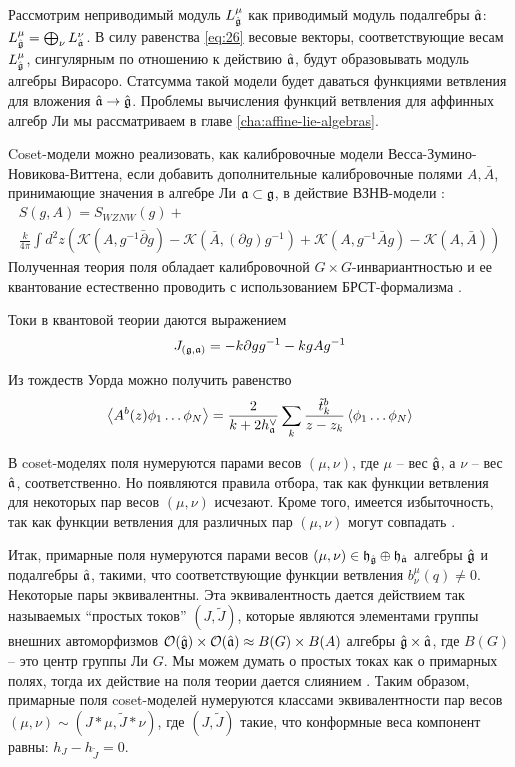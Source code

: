 Рассмотрим неприводимый модуль $L^{\mu}_{\hat{\mathfrak{g}}}$ как приводимый модуль подалгебры $\hat{\mathfrak{a}}$: $L^{\mu}_{\hat{\mathfrak{g}}}=\bigoplus_{\nu}L^{\nu}_{\hat{\mathfrak{a}}}$.  В силу  равенства \eqref{eq:26} весовые векторы, соответствующие весам $L^{\mu}_{\hat{\mathfrak{g}}}$, сингулярным по отношению к действию $\hat{\mathfrak{a}}$, будут образовывать модуль алгебры Вирасоро. Статсумма такой модели будет даваться функциями ветвления для вложения $\hat{\mathfrak{a}}\to\hat{\mathfrak{g}}$. Проблемы вычисления функций ветвления для аффинных алгебр Ли мы рассматриваем в главе \ref{cha:affine-lie-algebras}. 

Coset-модели можно реализовать, как калибровочные модели Весса-Зумино-Новикова-Виттена, если добавить дополнительные калибровочные полями  $A, \bar{A}$, принимающие значения в алгебре Ли $\mathfrak{a}\subset \mathfrak{g}$, в действие ВЗНВ-модели  \cite{gawdzki1988g}:
\begin{multline}
  \label{eq:38}
      S(g,A)=S_{WZNW}(g)+\\
      \frac{k}{4\pi}\int d^{2}z \left(\mathcal{K}(A, g^{-1}\bar \partial g)-\mathcal{K}(\bar A, (\partial g ) g^{-1})+\mathcal{K}(A,g^{-1}\bar A g)-\mathcal{K}(A,\bar A)\right)
\end{multline}
Полученная теория поля обладает калибровочной $G\times G$-инвариантностью  и ее квантование естественно проводить с использованием БРСТ-формализма \cite{hwang1993brst}. 

Токи в квантовой теории даются выражением
\begin{equation}
  \label{eq:39}
  J_{(\mathfrak{g},\mathfrak{a})}=-k\partial g g^{-1} -k g A g^{-1}
\end{equation}

Из тождеств Уорда можно получить равенство
\begin{equation*}
  \left< A^{b}(z)\phi_{1}\dots \phi_{N}\right>=\frac{2}{k+2 h^{\vee}_{\mathfrak{a}}}\sum_{k}\frac{\tilde{t}^{b}_{k}}{z-z_{k}}\left<\phi_{1}\dots \phi_{N}\right>
\end{equation*}

В coset-моделях поля нумеруются парами весов  $(\mu,\nu)$, где $\mu$ -- вес  $\hat{\mathfrak{g}}$, а $\nu$ -- вес $\hat{\mathfrak{a}}$, соответственно. Но появляются правила отбора, так как функции ветвления для некоторых пар весов  $(\mu,\nu)$ исчезают. Кроме того, имеется избыточность, так как функции ветвления для различных пар $(\mu,\nu)$ могут совпадать \cite{fuchs1996resolution,schellekens1990field}.

Итак, примарные поля нумеруются парами весов  $(\mu,\nu)\in \mathfrak{h}_{\hat{\mathfrak{g}}}\oplus \mathfrak{h}_{\hat{\mathfrak{a}}}$ алгебры $\hat{\mathfrak{g}}$ и подалгебры $\hat{\mathfrak{a}}$, такими, что соответствующие функции ветвления $b^{\mu}_{\nu}(q)\neq 0$. Некоторые пары эквивалентны. Эта эквивалентность дается действием так называемых ``простых токов'' $(J,\tilde{J})$, которые являются элементами группы внешних автоморфизмов  $\mathcal{O}(\hat{\mathfrak{g}})\times \mathcal{O}(\hat{\mathfrak{a}})\approx B(G)\times B(A)$ алгебры $\hat{\mathfrak{g}}\times\hat{\mathfrak{a}}$, где $B(G)$ -- это центр группы Ли $G$. Мы можем думать о простых токах как о примарных полях, тогда их действие на поля теории дается слиянием \cite{difrancesco1997cft}. Таким образом, примарные поля coset-моделей нумеруются классами эквивалентности пар весов  $(\mu,\nu)\sim (J*\mu,\tilde{J}*\nu)$, где $(J,\tilde J)$ такие, что  конформные веса компонент равны:  $h_{J}-h_{\tilde{J}}=0$. 

